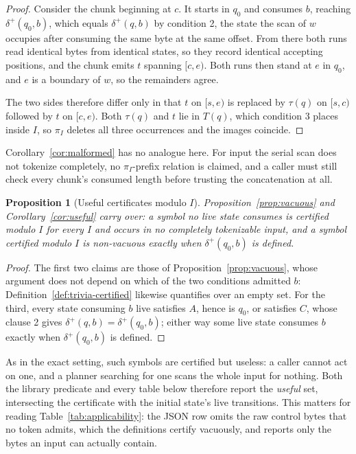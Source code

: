 \documentclass[11pt,a4paper]{article}
\theoremstyle{definition}
\theoremstyle{plain}
\newtheorem{proposition}{Proposition}
\begin{document}
\begin{proof}
Consider the chunk beginning at $c$. It starts in $q_0$ and consumes $b$, reaching $\delta^+(q_0, b)$, which equals
$\delta^+(q, b)$ by condition 2, the state the scan of $w$ occupies after consuming the same byte at the same offset.
From there both runs read identical bytes from identical states, so they record identical accepting positions, and the
chunk emits $t$ spanning $[c, e)$. Both runs then stand at $e$ in $q_0$, and $e$ is a boundary of $w$, so the
remainders agree.

The two sides therefore differ only in that $t$ on $[s, e)$ is replaced by $\tau(q)$ on $[s, c)$ followed by $t$ on
$[c, e)$. Both $\tau(q)$ and $t$ lie in $T(q)$, which condition 3 places inside $I$, so $\pi_I$ deletes all three
occurrences and the images coincide.
\end{proof}

Corollary~\ref{cor:malformed} has no analogue here. For input the serial scan does not tokenize completely, no
$\pi_I$-prefix relation is claimed, and a caller must still check every chunk's consumed length before trusting the
concatenation at all.

\begin{proposition}[Useful certificates modulo $I$]
\label{prop:useful}
Proposition~\ref{prop:vacuous} and Corollary~\ref{cor:useful} carry over: a symbol no live state consumes is certified
modulo $I$ for every $I$ and occurs in no completely tokenizable input, and a symbol certified modulo $I$ is
non-vacuous exactly when $\delta^+(q_0, b)$ is defined.
\end{proposition}

\begin{proof}
The first two claims are those of Proposition~\ref{prop:vacuous}, whose argument does not depend on which of the two
conditions admitted $b$: Definition~\ref{def:trivia-certified} likewise quantifies over an empty set. For the third,
every state consuming $b$ live satisfies $A$, hence is $q_0$, or satisfies $C$, whose clause 2 gives $\delta^+(q, b) =
\delta^+(q_0, b)$; either way some live state consumes $b$ exactly when $\delta^+(q_0, b)$ is defined.
\end{proof}

As in the exact setting, such symbols are certified but useless: a caller cannot act on one, and a planner searching
for one scans the whole input for nothing. Both the library predicate and every table below therefore report the
\emph{useful} set, intersecting the certificate with the initial state's live transitions. This matters for reading
Table~\ref{tab:applicability}: the JSON row omits the raw control bytes that no token admits, which the definitions
certify vacuously, and reports only the bytes an input can actually contain.
\end{document}

